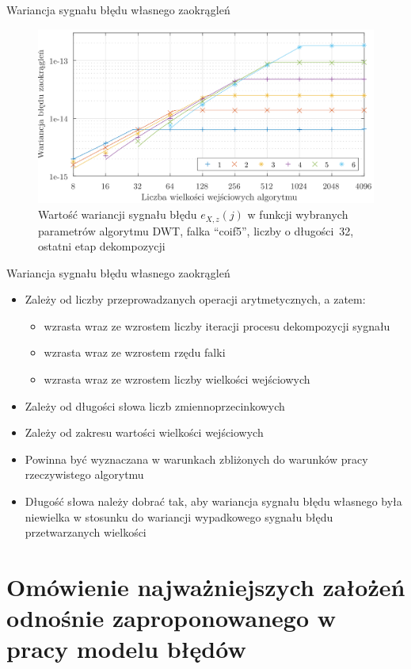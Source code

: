 \documentclass[12pt, polish, aspectratio = 169]{beamer}
\begin{document}
\begin{frame}{Wariancja sygnału błędu własnego zaokrągleń}
\begin{figure}
\includegraphics[scale = 0.75]{obrazki/dwt_rerror_coif5}
\caption{Wartość wariancji sygnału błędu $e_{X,z}(j)$ w funkcji wybranych parametrów algorytmu DWT, falka \enquote{coif5}, liczby o długości~\qty{32}{\bitOw}, ostatni etap dekompozycji}
\end{figure}
\end{frame}

\begin{frame}{Wariancja sygnału błędu własnego zaokrągleń}
\begin{itemize}
\item Zależy od liczby przeprowadzanych operacji arytmetycznych, a zatem:
	\begin{itemize}
	\item wzrasta wraz ze wzrostem liczby iteracji procesu dekompozycji sygnału
	\item wzrasta wraz ze wzrostem rzędu falki
	\item wzrasta wraz ze wzrostem liczby wielkości wejściowych
	\end{itemize}
\item Zależy od długości słowa liczb zmiennoprzecinkowych
\item Zależy od zakresu wartości wielkości wejściowych
\item Powinna być wyznaczana w warunkach zbliżonych do warunków pracy rzeczywistego algorytmu
\item Długość słowa należy dobrać tak, aby wariancja sygnału błędu własnego była niewielka w stosunku do wariancji wypadkowego sygnału błędu przetwarzanych wielkości
\end{itemize}
\end{frame}

\section{Omówienie najważniejszych założeń odnośnie zaproponowanego w pracy modelu błędów}
\end{document}
